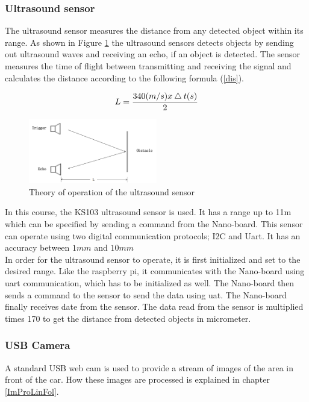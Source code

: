 \documentclass[11pt,twocolumn]{article}
\begin{document}
\subsubsection{Ultrasound sensor}
The ultrasound sensor measures the distance from any detected object within its range. As shown in Figure \ref{ultrasound} the ultrasound sensors detects objects by sending out ultrasound waves and receiving an echo, if an object is detected. The sensor measures the time of flight between transmitting and receiving the signal and calculates the distance according to the following formula (\ref{dis}).
	
\begin{equation}
\centering
L = \frac{340(m/s)x\bigtriangleup t(s)}{2}
\label{dis}
\end{equation}

\begin{figure}[h]
\centering
\includegraphics[width=0.5\textwidth]{ultrasound.png}
\caption{Theory of operation of the ultrasound sensor}
\label{ultrasound}
\end{figure}

In this course, the KS103 ultrasound sensor is used. It has a range up to 11m which can be specified by sending a command from the Nano-board. This sensor can operate using two digital communication protocols; I2C and Uart. It has an accuracy between $1mm$ and $10mm$\\
In order for the ultrasound sensor to operate, it is first initialized and set to the desired range. Like the raspberry pi, it communicates with the Nano-board using uart communication, which has to be initialized as well. The Nano-board then sends a command to the sensor to send the data using uat. The Nano-board finally receives date from the sensor. The data read from the sensor is multiplied times 170 to get the distance from detected objects in micrometer.  
\subsubsection{USB Camera}
A standard USB web cam is used to provide a stream of images of the area in front of the car. How these images are processed is explained in chapter \ref{ImProLinFol}.
\end{document}
